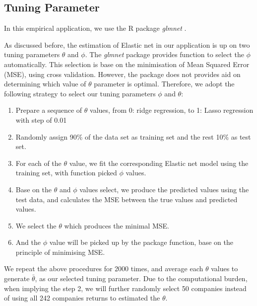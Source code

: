 \subsection{Tuning Parameter} \label{EN:parameter_tuning }
In this empirical application, we use the R package \textit{glmnet} \cite{Friedman2010, Simon2011}.

As discussed before, the estimation of Elastic net in our application is up on two tuning parameters $\theta$ and $\phi$.
The \textit{glmnet} package provides function to select the $\phi$ automatically. 
This selection is base on the minimisation of Mean Squared Error (MSE), using cross validation.
However, the package does not provides aid on determining which value of $\theta$ parameter is optimal.
Therefore, we adopt the following strategy to select our tuning parameters $\phi$  and $\theta$:
\begin{enumerate}
\item Prepare a sequence of $\theta$ values, from 0: ridge regression, to 1: Lasso regression with step of 0.01
\item Randomly assign 90\% of the data set as training set and the rest 10\% as test set. 
\item For each of the $\theta$ value, we fit the corresponding Elastic net model using the training set, with function picked $\phi$ values.
\item Base on the $\theta$ and $\phi$ values select, we produce the predicted values using the test data, and calculates the MSE between the true values and predicted values.
\item We select the $\theta$ which produces the minimal MSE.
\item And the $\phi$ value will be picked up by the package function, base on the principle of minimising MSE.
\end{enumerate}
We repeat the above procedures for 2000 times, and average each $\theta$ values to generate $\bar{\theta}$, as our selected tuning parameter.
Due to the computational burden, when implying the step 2, we will further randomly select 50 companies instead of using all 242 companies returns to estimated the $\theta$.


